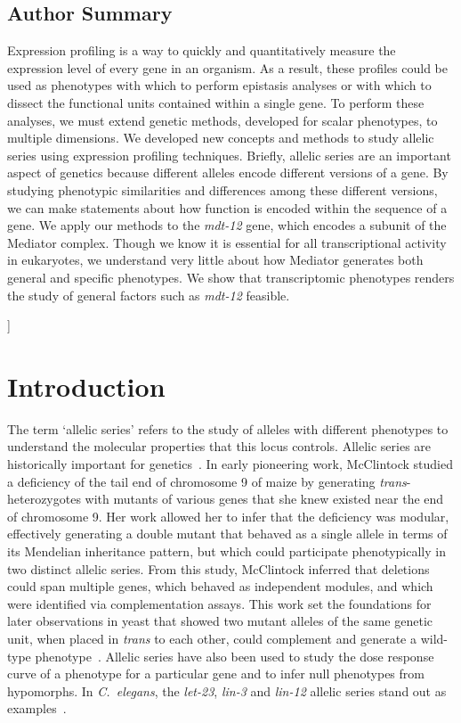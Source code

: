 \documentclass[10pt, twocolumn]{article}
\newcommand{\cel}{\emph{C.~elegans}}
\newcommand{\gene}[1]{\mbox{\emph{#1}}}
\newcommand{\dpy}{\gene{mdt-12}}
\begin{document}
\begin{@twocolumnfalse}
{    \section*{Author Summary}
    Expression profiling is a way to quickly and quantitatively measure the
    expression level of every gene in an organism. As a result, these profiles
    could be used as phenotypes with which to perform epistasis analyses or with
    which to dissect the functional units contained within a single gene. To
    perform these analyses, we must extend genetic methods, developed for scalar
    phenotypes, to multiple dimensions. We developed new concepts and methods
    to study allelic series using expression profiling techniques. Briefly,
    allelic series are an important aspect of genetics because different alleles
    encode different versions of a gene. By studying phenotypic similarities and
    differences among these different versions, we can make statements about how
    function is encoded within the sequence of a gene. We apply our methods to
    the \dpy{} gene, which encodes a subunit of the Mediator complex. Though we
    know it is essential for all transcriptional activity in eukaryotes, we
    understand very little about how Mediator generates both general and
    specific phenotypes. We show that transcriptomic phenotypes renders the
    study of general factors such as \dpy{} feasible.
    }
  \vspace{3mm}

  \end{@twocolumnfalse}
]


\linenumbers{}
\section*{Introduction}
The term `allelic series' refers to the study of alleles with different
phenotypes to understand the molecular properties that this locus controls.
Allelic series are historically important for genetics~\cite{McClintock1944}. In
early pioneering work, McClintock studied a deficiency of the tail end of
chromosome 9 of maize by generating \emph{trans}-heterozygotes with mutants of
various genes that she knew existed near the end of chromosome 9. Her work
allowed her to infer that the deficiency was modular, effectively generating a
double mutant that behaved as a single allele in terms of its Mendelian
inheritance pattern, but which could participate phenotypically in two distinct
allelic series. From this study, McClintock inferred that deletions could span
multiple genes, which behaved as independent modules, and which were identified
via complementation assays. This work set the foundations for later observations
in yeast that showed two mutant alleles of the same genetic unit, when placed in
\emph{trans} to each other, could complement and generate a wild-type
phenotype~\cite{FINCHAM1957}. Allelic series have also been used to study the
dose response curve of a phenotype for a particular gene and to infer null
phenotypes from hypomorphs. In \cel{}, the \gene{let-23}, \gene{lin-3} and
\gene{lin-12} allelic series stand out as
examples~\cite{Aroian1991,Ferguson1985a,Greenwald1983}.
\end{document}
